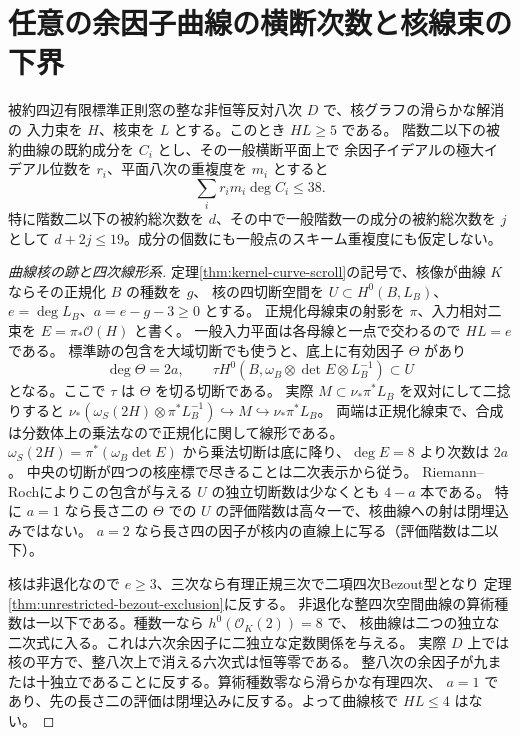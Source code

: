 \section{任意の余因子曲線の横断次数と核線束の下界}
\label{sec:sectional-cofactor-budget}
\begin{theorem}\label{thm:sectional-cofactor-budget}
被約四辺有限標準正則窓の整な非恒等反対八次 $D$ で、核グラフの滑らかな解消の
入力束を $H$、核束を $L$ とする。このとき $HL\ge5$ である。
階数二以下の被約曲線の既約成分を $C_i$ とし、その一般横断平面上で
余因子イデアルの極大イデアル位数を $r_i$、平面八次の重複度を $m_i$ とすると
\[
         \sum_i r_i m_i\deg C_i\le38.
\]
特に階数二以下の被約総次数を $d$、その中で一般階数一の成分の被約総次数を $j$ として
$d+2j\le19$。成分の個数にも一般点のスキーム重複度にも仮定しない。
\end{theorem}
\begin{proof}[曲線核の跡と四次線形系]
定理\ref{thm:kernel-curve-scroll}の記号で、核像が曲線 $K$ ならその正規化 $B$ の種数を $g$、
核の四切断空間を $U\subset H^0(B,L_B)$、$e=\deg L_B$、$a=e-g-3\ge0$ とする。
正規化母線束の射影を $\pi$、入力相対二束を $E=\pi_*\mathcal O(H)$ と書く。
一般入力平面は各母線と一点で交わるので $HL=e$ である。
標準跡の包含を大域切断でも使うと、底上に有効因子 $\Theta$ があり
\[
   \deg\Theta=2a,\qquad
   \tau H^0(B,\omega_B\otimes\det E\otimes L_B^{-1})\subset U
\]
となる。ここで $\tau$ は $\Theta$ を切る切断である。
実際 $M\subset\nu_*\pi^* L_B$ を双対にして二捻りすると
$\nu_*(\omega_S(2H)\otimes\pi^*L_B^{-1})\hookrightarrow M\hookrightarrow\nu_*\pi^*L_B$。
両端は正規化線束で、合成は分数体上の乗法なので正規化に関して線形である。
$\omega_S(2H)=\pi^*(\omega_B\det E)$ から乗法切断は底に降り、$\deg E=8$ より次数は $2a$。
中央の切断が四つの核座標で尽きることは二次表示から従う。
Riemann--Rochによりこの包含が与える $U$ の独立切断数は少なくとも $4-a$ 本である。
特に $a=1$ なら長さ二の $\Theta$ での $U$ の評価階数は高々一で、核曲線への射は閉埋込みではない。
$a=2$ なら長さ四の因子が核内の直線上に写る（評価階数は二以下）。

核は非退化なので $e\ge3$、三次なら有理正規三次で二項四次Bezout型となり
定理\ref{thm:unrestricted-bezout-exclusion}に反する。
非退化な整四次空間曲線の算術種数は一以下である。種数一なら $h^0(\mathcal O_K(2))=8$ で、
核曲線は二つの独立な二次式に入る。これは六次余因子に二独立な定数関係を与える。
実際 $D$ 上では核の平方で、整八次上で消える六次式は恒等零である。
整八次の余因子が九または十独立であることに反する。算術種数零なら滑らかな有理四次、
$a=1$ であり、先の長さ二の評価は閉埋込みに反する。よって曲線核で $HL\le4$ はない。
\end{proof}

